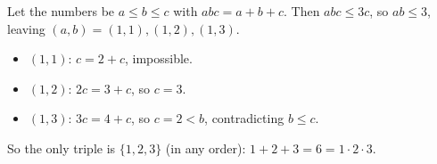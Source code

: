 Let the numbers be $a\le b\le c$ with $abc=a+b+c$. Then $abc\le3c$, so $ab\le3$, leaving $(a,b)=(1,1),(1,2),(1,3)$.
\begin{itemize}
\item $(1,1)$: $c=2+c$, impossible.
\item $(1,2)$: $2c=3+c$, so $c=3$.
\item $(1,3)$: $3c=4+c$, so $c=2<b$, contradicting $b\le c$.
\end{itemize}
So the only triple is $\boxed{\{1,2,3\}}$ (in any order): $1+2+3=6=1\cdot2\cdot3$.
